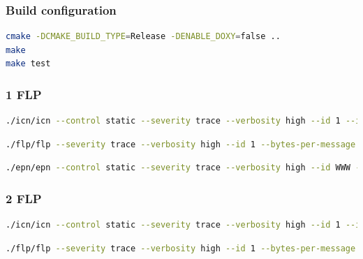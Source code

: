 \documentclass[]{article}
\begin{document}
\subsubsection{Build configuration}
\begin{lstlisting}[language=bash]
cmake -DCMAKE_BUILD_TYPE=Release -DENABLE_DOXY=false ..
make 
make test
\end{lstlisting}

\subsubsection{1 FLP}
\begin{lstlisting}[language=bash]
./icn/icn --control static --severity trace --verbosity high --id 1 --iterations ZZZ --rate YYY --channel-config name=broadcast,type=pub,method=bind,rateLogging=1,address=tcp://*:5005 name=feedback,type=pull,method=bind,rateLogging=1,address=tcp://*:5000
\end{lstlisting}

\begin{lstlisting}[language=bash]
./flp/flp --severity trace --verbosity high --id 1 --bytes-per-message XXXXXX --channel-config name=broadcast,type=sub,method=connect,rateLogging=1,address=tcp://10.42.0.1:5005
\end{lstlisting}

\begin{lstlisting}[language=bash]
./epn/epn --control static --severity trace --verbosity high --id WWW --primary-interface eth0 --num-flp 1 --channel-config name=WWW,type=pull,method=bind,address=tcp://*:5555,rateLogging=1 name=feedback,type=push,method=connect,address=tcp://10.42.0.1:5000
\end{lstlisting}

\subsubsection{2 FLP}
\begin{lstlisting}[language=bash]
./icn/icn --control static --severity trace --verbosity high --id 1 --iterations ZZZ --rate YYY --channel-config name=broadcast,type=pub,method=bind,rateLogging=1,address=tcp://*:5005 name=feedback,type=pull,method=bind,rateLogging=1,address=tcp://*:5000
\end{lstlisting}

\begin{lstlisting}[language=bash]
./flp/flp --severity trace --verbosity high --id 1 --bytes-per-message XXXXXX --channel-config name=broadcast,type=sub,method=connect,rateLogging=1,address=tcp://10.42.0.1:5005
\end{lstlisting}
\end{document}
